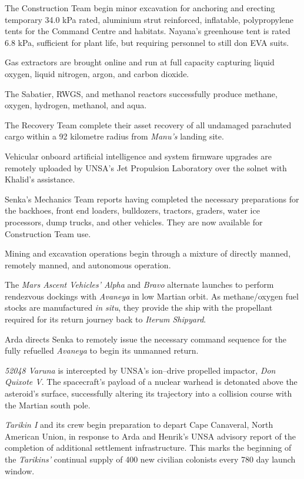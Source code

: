The Construction Team begin minor excavation for anchoring and erecting temporary 34.0 kPa rated, aluminium strut reinforced, inflatable, polypropylene tents for the Command Centre and habitats. Nayana's greenhouse tent is rated 6.8 kPa, sufficient for plant life, but requiring personnel to still don EVA suits.
\StopTimelineDate

Gas extractors are brought online and run at full capacity capturing liquid oxygen, liquid nitrogen, argon, and carbon dioxide. 

The Sabatier, RWGS, and methanol reactors successfully produce methane, oxygen, hydrogen, methanol, and aqua.
\StopTimelineDate

The Recovery Team complete their asset recovery of all undamaged parachuted cargo within a 92 kilometre radius from {\it Manu's} landing site.
\StopTimelineDate

Vehicular onboard artificial intelligence and system firmware upgrades are remotely uploaded by UNSA's Jet Propulsion Laboratory over the solnet with Khalid's assistance.

Senka's Mechanics Team reports having completed the necessary preparations for the backhoes, front end loaders, bulldozers, tractors, graders, water ice processors, dump trucks, and other vehicles. They are now available for Construction Team use.

Mining and excavation operations begin through a mixture of directly manned, remotely manned, and autonomous operation.
\StopTimelineDate

The {\it Mars Ascent Vehicles' Alpha} and {\it Bravo} alternate launches to perform rendezvous dockings with {\it Avaneya} in low Martian orbit. As methane/oxygen fuel stocks are manufactured {\it in situ}, they provide the ship with the propellant required for its return journey back to {\it Iterum Shipyard}.
\StopTimelineDate

Arda directs Senka to remotely issue the necessary command sequence for the fully refuelled {\it Avaneya} to begin its unmanned return.
\StopTimelineDate

{\it 52048 Varuna} is intercepted by UNSA's ion--drive propelled impactor, {\it Don Quixote V}. The spacecraft's payload of a nuclear warhead is detonated above the asteroid's surface, successfully altering its trajectory into a collision course with the Martian south pole.
\StopTimelineDate

{\it Tarikin I} and its crew begin preparation to depart Cape Canaveral, North American Union, in response to Arda and Henrik's UNSA advisory report of the completion of additional settlement infrastructure. This marks the beginning of the {\it Tarikins'} continual supply of 400 new civilian colonists every 780 day launch window.
\StopTimelineDate

